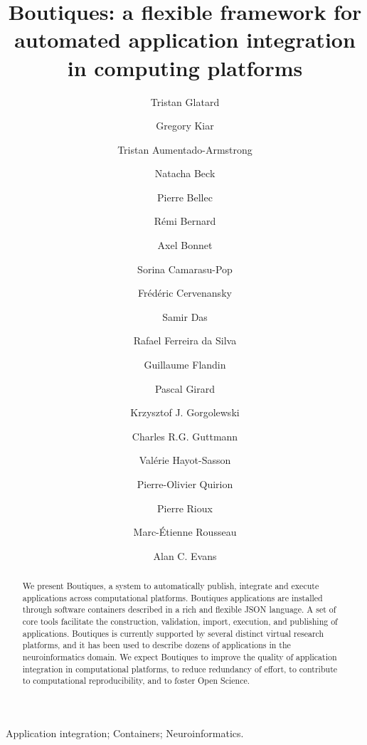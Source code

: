 \documentclass[a4paper,num-refs]{oup-contemporary}
\title{Boutiques: a flexible framework for automated application integration in computing platforms}
\newcommand{\boutiques}{Boutiques\xspace}
\begin{document}
\author[1]{Tristan Glatard}
\author[2,3]{Gregory Kiar}
\author[2,3]{Tristan Aumentado-Armstrong}
\author[2,3]{Natacha Beck}
\author[4]{Pierre Bellec}
\author[2,3]{R\'emi Bernard}
\author[5]{Axel Bonnet}
\author[5]{Sorina Camarasu-Pop}
\author[5]{Fr\'ed\'eric Cervenansky}
\author[2,3]{Samir Das}
\author[6]{Rafael Ferreira da Silva}
\author[7]{Guillaume Flandin}
\author[5]{Pascal Girard}
\author[8]{Krzysztof J. Gorgolewski}
\author[9]{Charles R.G. Guttmann}
\author[1]{Val\'erie Hayot-Sasson}
\author[4]{Pierre-Olivier Quirion}
\author[2,3]{Pierre Rioux}
\author[10]{Marc-\'Etienne Rousseau}
\author[2,3]{Alan C. Evans}


\begin{frontmatter}
\maketitle

\begin{abstract}
We present \boutiques, a system to automatically publish, integrate
and execute applications across computational platforms. \boutiques
applications are installed through software containers described in a
rich and flexible JSON language. A set of core tools facilitate the
construction, validation, import, execution, and publishing of
applications. \boutiques is currently supported by several distinct virtual
research platforms, and it has been used to describe dozens of
applications in the neuroinformatics domain. We expect \boutiques to
improve the quality of application integration in computational
platforms, to reduce redundancy of effort, to contribute to computational
reproducibility, and to foster Open Science.
\end{abstract}

\begin{keywords}
Application integration; Containers; Neuroinformatics.
\end{keywords}
\end{frontmatter}
\end{document}

